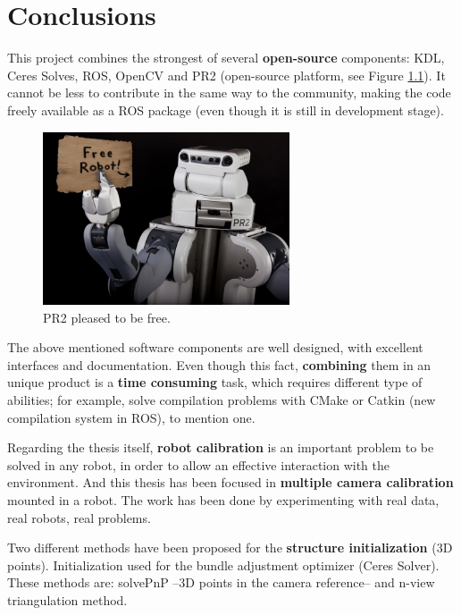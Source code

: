 \chapter{Conclusions}
\label{cha:conclusions}

This project combines the strongest of several \textbf{open-source} components: KDL, Ceres Solves, ROS, OpenCV and PR2 (open-source platform, see Figure \ref{fig:PR2_free_robot}). It cannot be less to contribute in the same way to the community, making the code freely available as a ROS package (even though it is still in development stage).

\begin{figure}[!htbp]
 \centering
 \includegraphics[width=0.65\textwidth]{images/PR2_free_robot.jpg}
 \caption{PR2 pleased to be free.}
 \label{fig:PR2_free_robot}
\end{figure}

The above mentioned software components are well designed, with excellent interfaces and documentation. Even though this fact, \textbf{combining} them in an unique product is a \textbf{time consuming} task, which requires different type of abilities; for example, solve compilation problems with CMake or Catkin (new compilation system in ROS), to mention one.

Regarding the thesis itself, \textbf{robot calibration} is an important problem to be solved in any robot, in order to allow an effective interaction with the environment. And this thesis has been focused in \textbf{multiple camera calibration} mounted in a robot. The work has been done by experimenting with real data, real robots, real problems.

Two different methods have been proposed for the \textbf{structure initialization} (3D points). Initialization used for the bundle adjustment optimizer (Ceres Solver). These methods are: solvePnP --3D points in the camera reference-- and n-view triangulation method.

